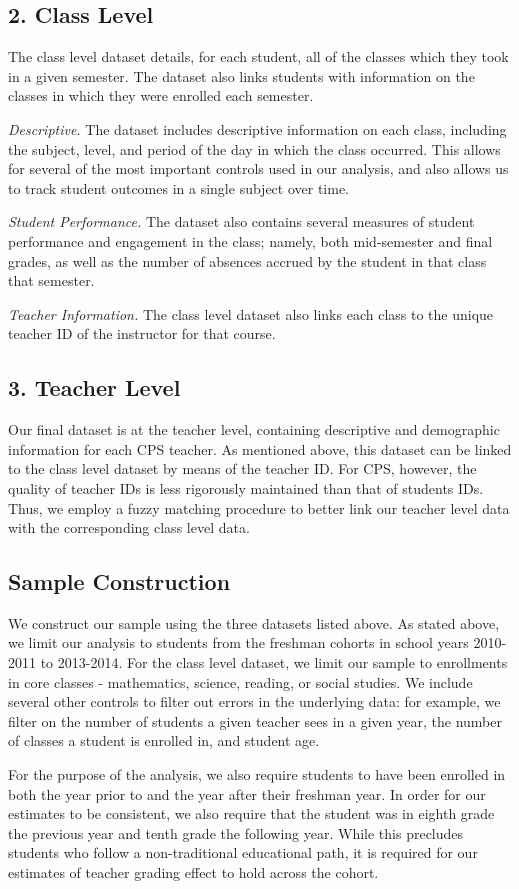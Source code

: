 \documentclass{article}
\begin{document}
\subsection{2. Class Level}

The class level dataset details, for each student, all of the classes which they took in a given semester. The dataset also links students with information on the classes in which they were enrolled each semester. 

\textit{Descriptive.} The dataset includes descriptive information on each class, including the subject, level, and period of the day in which the class occurred. This allows for several of the most important controls used in our analysis, and also allows us to track student outcomes in a single subject over time. 

\textit{Student Performance.} The dataset also contains several measures of student performance and engagement in the class; namely, both mid-semester and final grades, as well as the number of absences accrued by the student in that class that semester. 

\textit{Teacher Information.} The class level dataset also links each class to the unique teacher ID of the instructor for that course. 

\subsection{3. Teacher Level} 

Our final dataset is at the teacher level, containing descriptive and demographic information for each CPS teacher. As mentioned above, this dataset can be linked to the class level dataset by means of the teacher ID. For CPS, however, the quality of teacher IDs is less rigorously maintained than that of students IDs. Thus, we employ a fuzzy matching procedure to better link our teacher level data with the corresponding class level data. 

\subsection{Sample Construction}

We construct our sample using the three datasets listed above. As stated above, we limit our analysis to students from the freshman cohorts in school years 2010-2011 to 2013-2014. For the class level dataset, we limit our sample to enrollments in core classes - mathematics, science, reading, or social studies. We include several other controls to filter out errors in the underlying data: for example, we filter on the number of students a given teacher sees in a given year, the number of classes a student is enrolled in, and student age. 

For the purpose of the analysis, we also require students to have been enrolled in both the year prior to and the year after their freshman year. In order for our estimates to be consistent, we also require that the student was in eighth grade the previous year and tenth grade the following year. While this precludes students who follow a non-traditional educational path, it is required for our estimates of teacher grading effect to hold across the cohort. 

\end{document}
